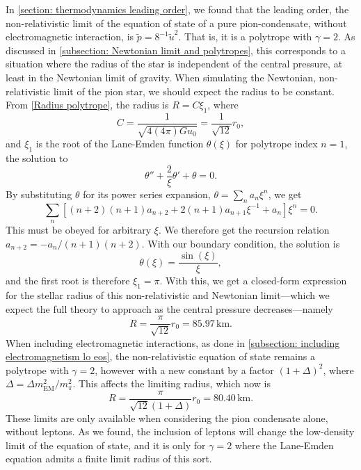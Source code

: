 In \autoref{section: thermodynamics leading order}, we found that the leading order, the non-relativistic limit of the equation of state of a pure pion-condensate, without electromagnetic interaction, is $\tilde p =8^{-1} \tilde u^2$.
That is, it is a polytrope with $\gamma = 2$.
As discussed in \autoref{subsection: Newtonian limit and polytropes}, this corresponds to a situation where the radius of the star is independent of the central pressure, at least in the Newtonian limit of gravity.
When simulating the Newtonian, non-relativistic limit of the pion star, we should expect the radius to be constant.
From \autoref{Radius polytrope}, the radius is $R = C \xi_1$, where
%
\begin{equation}
    C = \frac{1}{\sqrt{4(4\pi ) G u_0}} = \frac{1}{\sqrt{12}}r_0,
\end{equation}
%
and $\xi_1$ is the root of the Lane-Emden function $\theta(\xi)$ for polytrope index $n=1$, the solution to
%
\begin{equation}
    \theta'' + \frac{2}{\xi} \theta' + \theta = 0.
\end{equation}
%
By substituting $\theta$ for its power series expansion, $\theta = \sum_n a_n \xi^n$, we get
%
\begin{equation}
    \sum_n \left[ (n+2)(n+1) a_{n+2} + 2(n+1) a_{n+1} \xi^{-1} + a_n \right] \xi^n = 0.
\end{equation}
%
This must be obeyed for arbitrary $\xi$.
We therefore get the recursion relation $a_{n+2} = - a_n / (n+1)(n+2)$.
With our boundary condition, the solution is
%
\begin{equation}
    \theta(\xi) = \frac{\sin(\xi)}{\xi},
\end{equation}
%
and the first root is therefore $\xi_1 = \pi$.
With this, we get a closed-form expression for the stellar radius of this non-relativistic and Newtonian limit---which we expect the full theory to approach as the central pressure decreases---namely
%
\begin{equation}
    \label{radius pion star nr limit}
    R = \frac{\pi}{\sqrt{12}} r_0 = 85.97 \, \text{km}.
\end{equation}
%
When including electromagnetic interactions, as done in \autoref{subsection: including electromagnetism lo eos}, the non-relativistic equation of state remains a polytrope with $\gamma=2$, however with a new constant by a factor $(1+\Delta)^2$, where $\Delta = \Delta m^2_\text{EM}/m_\pi^2$.
This affects the limiting radius, which now is
%
\begin{equation}
    \label{maximum mass pion star with em interaction}
    R = \frac{\pi}{\sqrt{12}(1 + \Delta)} r_0 = 80.40 \, \text{km}.
\end{equation}
%
These limits are only available when considering the pion condensate alone, without leptons.
As we found, the inclusion of leptons will change the low-density limit of the equation of state, and it is only for $\gamma=2$ where the Lane-Emden equation admits a finite limit radius of this sort.



